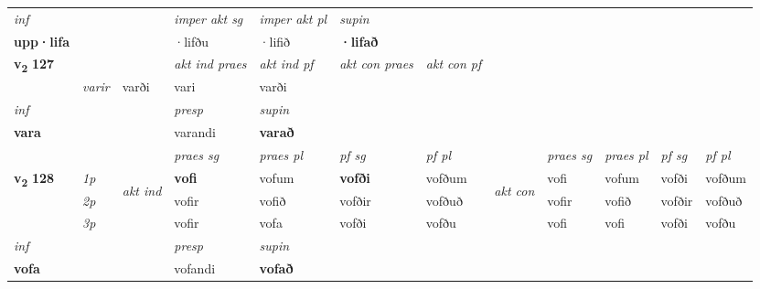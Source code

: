 \begin{longtable}[l]{X>{\footnotesize\itshape}llXXXXlXXXX}
   {\textit{inf}} & &  & \textit{imper akt sg} & \textit{imper akt pl}    & \textit{supin}   \\*
  {\textbf{upp\allowbreak ·lifa}} & && ·lifðu  & ·lifið    &  \textbf{·lifað}   \\*

\midrule

\multirow{2}{*}{{{\textbf{v{\textsubscript{2}}} \Large{\textbf{127}}}}}  &&&  \textit{akt ind praes} & \textit{akt ind pf} & \textit{akt con praes} & \textit{akt con pf} \\*
\multicolumn{3}{r}{\textit{e-n}} & varir & varði & vari & varði \\*

\cmidrule{4-7}
   {\textit{inf}} & &     & \textit{presp} & \textit{supin}   \\*
  {\textbf{vara}} & &     & varandi &  \textbf{varað}   \\*

\midrule

 & &   & \textit{praes sg}  & \textit{praes pl}    & \textit{ pf sg} & \textit{pf pl} & & \textit{praes sg}  & \textit{praes pl}    & \textit{pf sg} & \textit{pf pl }  \\ \cmidrule{4-7} \cmidrule{9-12}
 \multirow{2}{*}{{{\textbf{v{\textsubscript{2}}} \Large{\textbf{128}}}}}  & 1p & \multirow{3}{*}{\begin{turn}{90}\textit{akt ind}\end{turn}} & \textbf{vofi} & vofum & \textbf{vofði} & vofðum & \multirow{3}{*}{\begin{turn}{90}\textit{akt con}\end{turn}} &vofi & vofum & vofði & vofðum\\*
 & 2p &  &  vofir  & vofið & vofðir & vofðuð & & vofir & vofið & vofðir & vofðuð \\*
 & 3p &  & vofir & vofa & vofði & vofðu & & vofi & vofi& vofði & vofðu \\*
\cmidrule{4-7} \cmidrule{9-12}

   {\textit{inf}} & &     & \textit{presp} & \textit{supin}   \\*
  {\textbf{vofa}} & &     & vofandi &  \textbf{vofað}   \\*

\midrule


\end{longtable}
